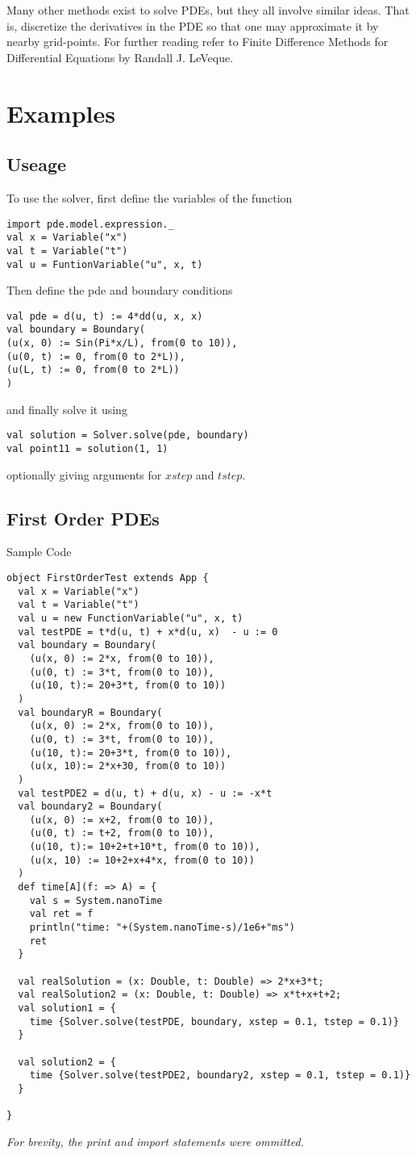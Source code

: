 Many other methods exist to solve PDEs, but they all involve similar
ideas. That is, discretize the derivatives in the PDE so that one may
approximate it by nearby grid-points. For further reading refer to Finite Difference Methods for
Differential Equations by Randall J. LeVeque\cite{leveque}.
\section{Examples}
\subsection{Useage}
To use the solver, first define the variables of the function
\begin{verbatim}
import pde.model.expression._
val x = Variable("x")
val t = Variable("t")
val u = FuntionVariable("u", x, t)
\end{verbatim}
Then define the pde and boundary conditions
\begin{verbatim}
val pde = d(u, t) := 4*dd(u, x, x)
val boundary = Boundary(
(u(x, 0) := Sin(Pi*x/L), from(0 to 10)),
(u(0, t) := 0, from(0 to 2*L)),
(u(L, t) := 0, from(0 to 2*L))
)
\end{verbatim}
and finally solve it using
\begin{verbatim}
val solution = Solver.solve(pde, boundary)
val point11 = solution(1, 1)
\end{verbatim}
optionally giving arguments for $xstep$ and $tstep$.
\subsection{First Order PDEs}
Sample Code
\begin{verbatim}
object FirstOrderTest extends App {
  val x = Variable("x")
  val t = Variable("t")
  val u = new FunctionVariable("u", x, t)
  val testPDE = t*d(u, t) + x*d(u, x)  - u := 0
  val boundary = Boundary(
    (u(x, 0) := 2*x, from(0 to 10)),
    (u(0, t) := 3*t, from(0 to 10)),
    (u(10, t):= 20+3*t, from(0 to 10))
  )
  val boundaryR = Boundary(
    (u(x, 0) := 2*x, from(0 to 10)),
    (u(0, t) := 3*t, from(0 to 10)),
    (u(10, t):= 20+3*t, from(0 to 10)),
    (u(x, 10):= 2*x+30, from(0 to 10))
  )
  val testPDE2 = d(u, t) + d(u, x) - u := -x*t
  val boundary2 = Boundary(
    (u(x, 0) := x+2, from(0 to 10)),
    (u(0, t) := t+2, from(0 to 10)),
    (u(10, t):= 10+2+t+10*t, from(0 to 10)),
    (u(x, 10) := 10+2+x+4*x, from(0 to 10))
  )
  def time[A](f: => A) = {
    val s = System.nanoTime
    val ret = f
    println("time: "+(System.nanoTime-s)/1e6+"ms")
    ret
  }

  val realSolution = (x: Double, t: Double) => 2*x+3*t;
  val realSolution2 = (x: Double, t: Double) => x*t+x+t+2;
  val solution1 = {
    time {Solver.solve(testPDE, boundary, xstep = 0.1, tstep = 0.1)}
  }

  val solution2 = {
    time {Solver.solve(testPDE2, boundary2, xstep = 0.1, tstep = 0.1)}
  }

}
\end{verbatim}
\emph{For brevity, the print and import statements were ommitted.}

